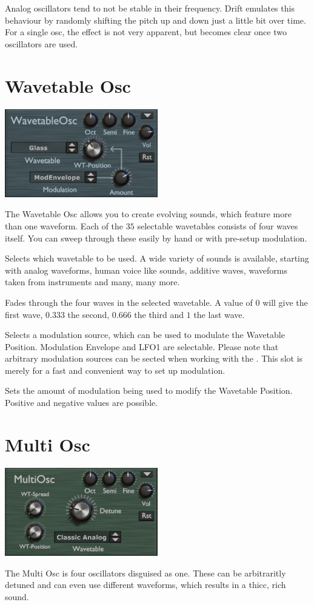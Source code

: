Analog oscillators tend to not be stable in their frequency. Drift emulates this behaviour by randomly shifting the pitch up and down just a little bit over time. For a single osc, the effect is not very apparent, but becomes clear once two oscillators are used.

\section{Wavetable Osc}
\begin{center}
    \includegraphics[width=0.5\textwidth]{graphics/wavetable_osc.png}
\end{center}
The Wavetable Osc allows you to create evolving sounds, which feature more than one waveform. Each of the $35$ selectable wavetables consists of four waves itself. You can sweep through these easily by hand or with pre-setup modulation.

Selects which wavetable to be used. A wide variety of sounds is available, starting with analog waveforms, human voice like sounds, additive waves, waveforms taken from instruments and many, many more.

Fades through the four waves in the selected wavetable. A value of $0$ will give the first wave, $0.333$ the second, $0.666$ the third and $1$ the last wave.

Selects a modulation source, which can be used to modulate the Wavetable Position. Modulation Envelope and LFO1 are selectable. Please note that arbitrary modulation sources can be sected when working with the \modmatrix. This slot is merely for a fast and convenient way to set up modulation.

Sets the amount of modulation being used to modify the Wavetable Position. Positive and negative values are possible.

\section{Multi Osc}
\begin{center}
    \includegraphics[width=0.5\textwidth]{graphics/multi_osc.png}
\end{center}
The Multi Osc is four oscillators disguised as one. These can be arbitraritly detuned and can even use different waveforms, which results in a thicc, rich sound.

